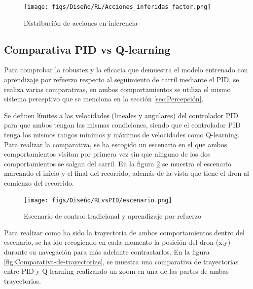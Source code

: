 \begin{figure} [H]
  \begin{center}
    \texttt{[image: figs/Diseño/RL/Acciones\_inferidas\_factor.png]}
  \end{center}
  \caption{Distribución de acciones en inferencia}
  \label{fig:inferencia_factor}
\end{figure}

\subsection{Comparativa PID vs Q-learning}
\label{sec:Análisis y comparativa entre el seguiento de carril clásico}
Para comprobar la robustez y la eficacia que demuestra el modelo entrenado con aprendizaje por refuerzo respecto al seguimiento de carril mediante el PID, se realiza varias comparativas, en ambos
comportamientos se utiliza el mismo sistema perceptivo que se menciona en la sección \ref{sec:Percepción}. 

Se definen límites a las velocidades (lineales y angulares) del controlador PID para que ambos tengan las mismas condiciones, siendo que el controlador PID tenga los mismos 
rangos mínimos y máximos de velocidades como Q-learning. Para realizar la comparativa, se ha escogido un escenario en el que ambos comportamientos visitan por primera vez 
sin que ninguno de los dos comportamientos se salgan del carril. En la figura \ref{fig:escenario-comparativa} se muestra el escenario marcando el inicio 
y el final del recorrido, además de la vista que tiene el dron al comienzo del recorrido.


\begin{figure} [H]
  \begin{center}
    \texttt{[image: figs/Diseño/RLvsPID/escenario.png]}
  \end{center}
  \caption{Escenario de control tradicional y aprendizaje por refuerzo}
  \label{fig:escenario-comparativa}
\end{figure}

Para realizar como ha sido la trayectoria de ambos comportamientos dentro del escenario, se ha ido recogiendo en cada momento la posición del dron (x,y) durante su navegación
 para más adelante contrastarlos. En la figura \ref{fig:Comparativa-de-trayectorias}, se muestra una comparativa de trayectorias entre PID y Q-learning 
realizando un zoom en una de las partes de ambas 
trayectorias.

